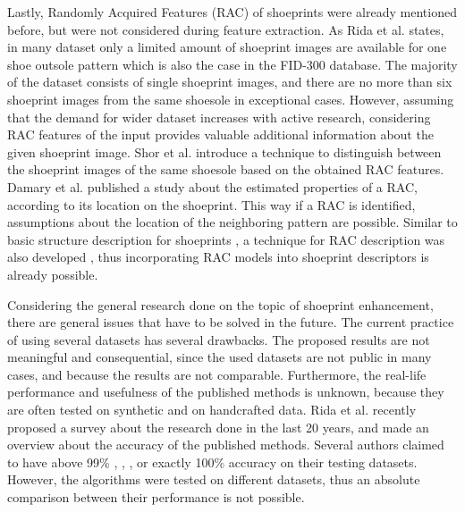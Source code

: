 \documentclass[draft,final]{vutinfth} %
\begin{document}
\par
Lastly, Randomly Acquired Features (RAC) of shoeprints were already mentioned before, but were not considered during feature extraction.
As Rida et al. \cite{rida2019forensic} states, in many dataset only a limited amount of shoeprint images are available for one shoe outsole pattern which is also the case in the FID-300 database.
The majority of the dataset consists of single shoeprint images, and there are no more than six shoeprint images from the same shoesole in exceptional cases. 
However, assuming that the demand for wider dataset increases with active research, considering RAC features of the input provides valuable additional information about the given shoeprint image.
Shor et al. \cite{shor2018inherent} introduce a technique to distinguish between the shoeprint images of the same shoesole based on the obtained RAC features.
Damary et al. \cite{damary2018dependence} published a study about the estimated properties of a RAC, according to its location on the shoeprint.
This way if a RAC is identified, assumptions about the location of the neighboring pattern are possible.
Similar to basic structure description for shoeprints \cite{tang2010footwear}, a technique for RAC description was also developed \cite{speir2016quantifying}, thus incorporating RAC models into shoeprint descriptors is already possible.
\par
Considering the general research done on the topic of shoeprint enhancement, there are general issues that have to be solved in the future.
The current practice of using several datasets has several drawbacks.
The proposed results are not meaningful and consequential, since the used datasets are not public in many cases, and because the results are not comparable.
Furthermore, the real-life performance and usefulness of the published methods is unknown, because they are often tested on synthetic and on handcrafted data.
Rida et al. \cite{rida2019forensic} recently proposed a survey about the research done in the last 20 years, and made an overview about the accuracy of the published methods.
Several authors claimed to have above 99\% \cite{algarni2008novel}, \cite{alizadeh2017automatic}, \cite{almaadeed2015partial}, or exactly 100\% accuracy \cite{gueham2007automatic} on their testing datasets.
However, the algorithms were tested on different datasets, thus an absolute comparison between their performance is not possible.

\end{document}
